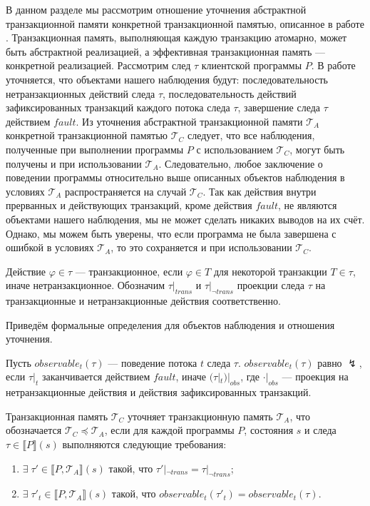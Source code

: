 В данном разделе мы рассмотрим отношение уточнения абстрактной транзакционной памяти конкретной транзакционной памятью, описанное в работе \cite{tms_article}. Транзакционная память, выполняющая каждую транзакцию атомарно, может быть абстрактной реализацией, а эффективная транзакционная память --- конкретной реализацией. Рассмотрим след $\tau$ клиентской программы $P$. В работе \cite{tms_article} уточняется, что объектами нашего наблюдения будут: последовательность нетранзакционных действий следа $\tau$, последовательность действий зафиксированных транзакций каждого потока следа $\tau$, завершение следа $\tau$ действием $fault$. Из уточнения абстрактной транзакционной памяти $\mathcal{T}_A$ конкретной транзакционной памятью $\mathcal{T}_C$ следует, что все наблюдения, полученные при выполнении программы $P$ с использованием $\mathcal{T}_C$, могут быть получены и при использовании $\mathcal{T}_A$. Следовательно, любое заключение о поведении программы относительно выше описанных объектов наблюдения в условиях $\mathcal{T}_A$ распространяется на случай $\mathcal{T}_C$. Так как действия внутри прерванных и действующих транзакций, кроме действия $fault$, не являются объектами нашего наблюдения, мы не может сделать никаких выводов на их счёт. Однако, мы можем быть уверены, что если программа не была завершена с ошибкой в условиях $\mathcal{T}_A$, то это сохраняется и при использовании $\mathcal{T}_C$.

Действие $\varphi \in \tau$ --- транзакционное, если $\varphi \in T$ для некоторой транзакции $T \in \tau$, иначе нетранзакционное. Обозначим $\tau|_{trans}$ и $\tau|_{\neg trans}$ проекции следа $\tau$ на транзакционные и нетранзакционные действия соответственно.

Приведём формальные определения для объектов наблюдения и отношения уточнения. 

\begin{mydefinition}
Пусть $observable_t(\tau)$ --- поведение потока $t$ следа $\tau$. $observable_t(\tau)$ равно $\lightning$, если $\tau|_t$ заканчивается действием $fault$, иначе $(\tau|_t)|_{obs}$, где $\cdot|_{obs}$ --- проекция на нетранзакционные действия и действия зафиксированных транзакций.
\end{mydefinition}

\begin{mydefinition}\label{obs_ref}
Транзакционная память $\mathcal{T}_C$ уточняет транзакционную память $\mathcal{T}_A$, что обозначается $\mathcal{T}_C \preceq \mathcal{T}_A$, если для каждой программы $P$, состояния $s$ и следа $\tau \in \llbracket P \rrbracket(s)$ выполняются следующие требования: \begin{enumerate}
\item $\exists \; \tau' \in \llbracket P, \mathcal{T}_A \rrbracket(s)$ такой, что $\tau'|_{\neg trans} = \tau|_{\neg trans}$; \label{obs:1}
\item $\exists \; \tau'_t \in \llbracket P, \mathcal{T}_A \rrbracket(s)$ такой, что $observable_t(\tau'_t) = observable_t(\tau)$. \label{obs:2}
\end{enumerate} 
\end{mydefinition}

